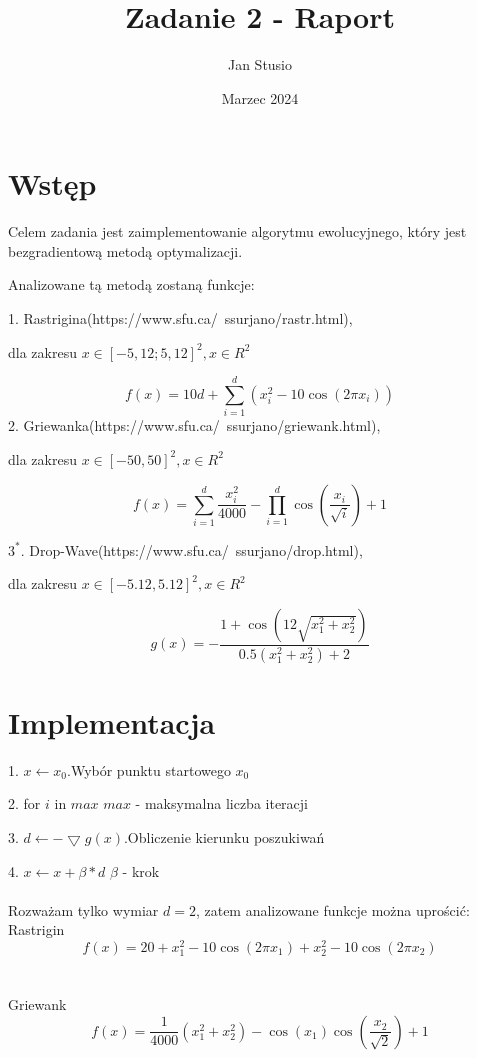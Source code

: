 \documentclass{article}
\title{Zadanie 2 - Raport}
\author{Jan Stusio}
\date{Marzec 2024}
\begin{document}
\maketitle

\section{Wstęp}

Celem zadania jest zaimplementowanie algorytmu ewolucyjnego, który jest bezgradientową metodą optymalizacji.


Analizowane tą metodą zostaną funkcje:

1. Rastrigina(https://www.sfu.ca/~ssurjano/rastr.html),

dla zakresu $x \in [-5,12;5,12]^2, x \in R^2$

$$
f(x) = 10d + \sum_{i=1}^{d} \left( x_i^2 - 10 \cos(2 \pi x_i) \right)
$$
2. Griewanka(https://www.sfu.ca/~ssurjano/griewank.html),

dla zakresu $x \in [-50, 50]^2, x \in R^2$

$$
f(x) =\sum_{i=1}^{d} \frac{x_i^2}{4000} - \prod_{i=1}^{d} \cos\left(\frac{x_i}{\sqrt{i}}\right) +1
$$

$3^*$. Drop-Wave(https://www.sfu.ca/~ssurjano/drop.html),

dla zakresu $x \in [-5.12, 5.12]^2, x \in R^2$

$$
g(x) = -\frac{1 + \cos\left(12 \sqrt{x_1^2 + x_2^2}\right)}{0.5(x_1^2 + x_2^2) + 2}
$$

\pagebreak

\section{Implementacja}

1. $x \leftarrow x_0$.\quad \quad  \quad \quad \quad \quad \quad \quad Wybór punktu startowego $x_0$

2. for $i$ in $max$ \quad \quad \quad \quad \quad \quad $max$ - maksymalna liczba iteracji

3. $d \leftarrow -\bigtriangledown g(x)$.\quad \quad \quad \quad \quad  Obliczenie kierunku poszukiwań

4. $x \leftarrow x + \beta * d$ \quad \quad \quad \quad \quad  $\beta$ - krok
\\\\
Rozważam tylko wymiar $d = 2$, zatem analizowane funkcje można uprościć:\\
Rastrigin\\
$$f(x) = 20 + x_1^2 - 10 \cos(2 \pi x_1) + x_2^2 - 10 \cos(2 \pi x_2)
$$
\\\\
Griewank\\
$$f(x) =\frac{1}{4000} (x_1^2 + x_2^2) - \cos\left(x_1\right) \cos\left(\frac{x_2}{\sqrt{2}}\right) + 1
$$
\end{document}
